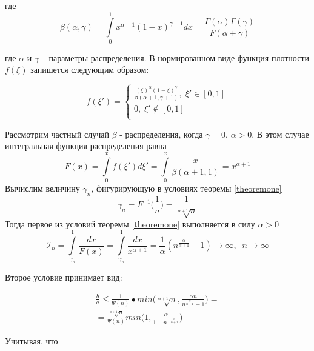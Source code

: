 \documentclass[a4paper, 14pt]{extarticle}
\numberwithin{equation}{section}
\begin{document}
где
\begin{equation*}
\beta(\alpha, \gamma) = \int\limits_0^1 x^{\alpha-1} (1-x)^{\gamma-1} dx = \frac{\Gamma(\alpha)\Gamma(\gamma)}{F(\alpha+\gamma)}
\end{equation*}

где $\alpha$ и $\gamma$ -- параметры распределения. В нормированном виде функция плотности $f(\xi)$ запишется следующим образом:

\begin{equation*}
f(\xi') = 
\begin{cases}
   \frac{(\xi)^\alpha (1-\xi)^\gamma}{ \beta(\alpha+1, \gamma+1)}, \;  \xi' \in [0,1]\\
   0, \;  \xi' \notin [0,1] \\
 \end{cases}
\end{equation*}

Рассмотрим частный случай $\beta$ - распределения, когда $\gamma=0$, $\alpha>0$. В этом случае интегральная функция распределения равна
\begin{equation*}
F(x) = \int\limits_0^x f(\xi')d\xi' = \int\limits_0^x \frac{x}{\beta(\alpha+1,1)} = x^{\alpha+1}
\end{equation*} 
Вычислим величину $\gamma_n$, фигурирующую в условиях теоремы \eqref{theoremone}
\begin{equation*}
\gamma_n = F^{-1} \Big(\frac{1}{n} \Big) = \frac{1}{\sqrt[\alpha+1]{n}}
\end{equation*}
Тогда первое из условий теоремы \eqref{theoremone} выполняется в силу $\alpha>0$
\begin{equation*}
\mathcal{I}_n = \int\limits_{\gamma_n}^1 \frac{dx}{F(x)} = \int\limits_{\gamma_n}^1 \frac{dx}{x^{\alpha+1}} = \frac{1}{\alpha} (n^{\frac{\alpha}{\alpha+1}}-1) \rightarrow \infty, \; \; n\rightarrow \infty
\end{equation*}

Второе условие принимает вид:

\begin{equation*}
\begin{aligned}
\frac{b}{a} \leqslant \frac{1}{\Psi(n)}•min \Big(\sqrt[\alpha+1]{n}, \frac{\alpha n}{n^{\frac{\alpha}{\alpha+1}}-1} \Big) = \\
=\frac{\sqrt[\alpha+1]{n}}{\Psi(n)} min \Big(1, \frac{\alpha}{1-n^{-\frac{\alpha}{\alpha+1}}} \Big)
\end{aligned}
\end{equation*}

Учитывая, что
\end{document}
